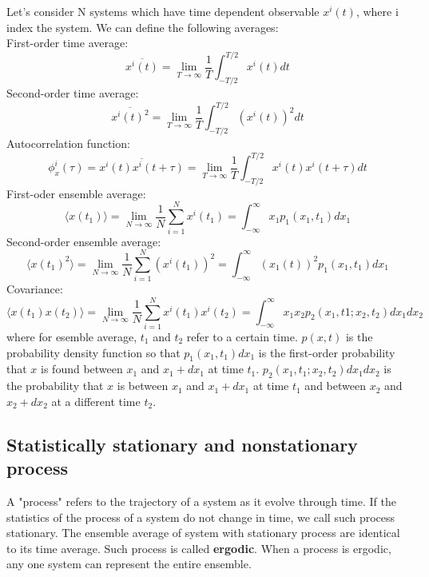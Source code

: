 \documentclass{article}
\begin{document}
Let's consider N systems which have time dependent observable $x^{i}(t)$, where
i index the system. We can define the following averages: \\
First-order time average: 
\begin{equation}
    \overline{x^i(t)} = \lim_{T\to\infty} \frac{1}{T} \int_{-T/2}^{T/2} x^i(t) dt
\end{equation}
Second-order time average:
\begin{equation}
    \overline{x^i(t)^2} = \lim_{T\to\infty} \frac{1}{T} \int_{-T/2}^{T/2} \left( x^i(t) \right)^2 dt
\end{equation}
Autocorrelation function:
\begin{equation}
    \phi_x^i(\tau) = \overline{x^i(t)x^i(t+\tau)} 
    = \lim_{T\to\infty} \frac{1}{T} \int_{-T/2}^{T/2} x^i(t) x^i(t+\tau) dt
\end{equation}
First-oder ensemble average:
\begin{equation}
    \langle x(t_1) \rangle = \lim_{N\to\infty} \frac{1}{N} \sum_{i=1}^{N} x^i(t_1) 
        = \int_{-\infty}^{\infty} x_1 p_1(x_1, t_1) dx_1
\end{equation}
Second-order ensemble average:
\begin{equation}
    \langle x(t_1)^2 \rangle = \lim_{N\to\infty} \frac{1}{N} \sum_{i=1}^{N} \left( x^i(t_1) \right)^2  
        = \int_{-\infty}^{\infty} \left( x_1(t) \right)^2  p_1(x_1, t_1) dx_1
\end{equation}
Covariance:
\begin{equation}
    \langle x(t_1)x(t_2) \rangle = \lim_{N\to\infty} \frac{1}{N} \sum_{i=1}^{N}  x^i(t_1) x^i(t_2)
        = \int_{-\infty}^{\infty} x_1 x_2 p_2(x_1, t1; x_2, t_2) dx_1 dx_2
\end{equation}
where for esemble average, $t_1$ and $t_2$ refer to a certain time. $p(x,t)$ is the 
probability density function so that $p_1(x_1,t_1)dx_1$ is the 
first-order probability that $x$ is found between $x_1$ and $x_1 + dx_1$ at time $t_1$. 
$p_2(x_1, t_1; x_2, t_2)dx_1 dx_2$ is the probability that $x$ is between $x_1$ and $x_1 + dx_1$
at time $t_1$ and between $x_2$ and $x_2 + dx_2$ at a different time $t_2$.

\subsection*{Statistically stationary and nonstationary process}
A "process" refers to the trajectory of a system as it evolve through time. If the 
statistics of the process of a system do not change in time, we call such 
process stationary. The ensemble average of system with stationary process 
are identical to its time average. Such process is called \textbf{ergodic}.
When a process is ergodic, any one system can represent the entire ensemble. 
\end{document}
